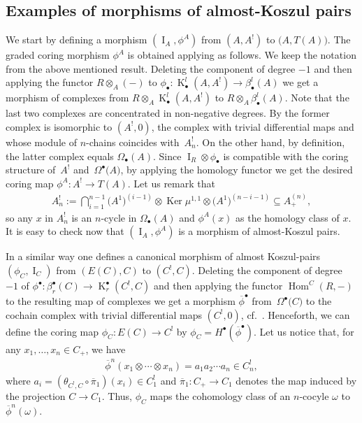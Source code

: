 \documentclass[pdftex]{sigma}
\newcommand{\ol}[1]{\overline{#1}}
\def\Id{\operatorname{I}}
\DeclareMathOperator{\Ker}{Ker}
\DeclareMathOperator{\K}{K}
\newcommand\ot{\otimes}
\newcommand{\Od}[2]{\Omega_{#1}(#2)}
\newcommand{\Ou}[2]{\Omega^{#1}\big(#2\big)}
\renewcommand{\^}[1]{\mbox{$^{\left( #1 \right)}$}}
\renewcommand{\_}[1]{\mbox{$_{\left( #1 \right)}$}}
\newcommand\Hom{\operatorname{Hom}}
\numberwithin{equation}{section}
\begin{document}
\subsection{Examples of morphisms of almost-Koszul pairs}\label{fa:exemples_morphisms}
We start by def\/ining a morphism $(\Id_A,\phi^A)$ from $(A,A^!)$ to $\big(A,T(A)\big)$. The graded coring morphism $\phi^A$ is obtained applying \cite[Proposition 1.24]{jps} as follows. We keep the notation from the above mentioned result. Deleting the component of degree $-1$ and then applying the functor $R\ot_A (-)$ to $\phi _{\bullet}\colon \K_{\bullet}^{l}(A,A^!)\to \beta_{\bullet}^{l}(A)$ we get a morphism of complexes from $R\ot_A \K_{\bullet}^{l}(A,A^!)$ to $R\ot_A \beta_{\bullet}^{l}(A)$. Note that the last two complexes are concentrated in non-negative degrees. By \cite[Proposition 1.23]{jps} the former complex is isomorphic to $(A^!,0)$, the complex with tri\-vial dif\/ferential maps and whose module of $n$-chains coincides with~$A^!_n$. On the other hand, by def\/inition, the latter complex equals $\Od{\bullet}{A}$. Since $\Id_R\ot\phi_\bullet$ is compatible with the coring structure of~$A^!$ and~$\Ou{\bullet}{A}$, by applying the homology functor we get the desired coring map $\phi^A\colon A^!\to T(A)$. Let us remark that
\begin{gather*} A^!_n:=\bigcap_{i=1}^{n-1}\big({A^1}\big)^{(i-1)}\ot\Ker\mu^{1,1}\ot \big({A^1}\big)^{(n-i-1)}\subseteq A_+^{(n)},
\end{gather*}
so any $x$ in $A^!_n$ is an $n$-cycle in $\Od{\bullet}{A}$ and $\phi^A(x)$ as the homology class of $x$. It is easy to check now that $(\Id_A,\phi^A)$ is a morphism of almost-Koszul pairs.

In a similar way one def\/ines a canonical morphism of almost Koszul-pairs $(\phi_C,\Id_C)$ from $(E(C),C)$ to $(C^!,C)$. Deleting the component of degree $-1$ of $\phi ^{\bullet}\colon \beta^\bullet_{r}(C)\to \K^\bullet_{r}(C^!,C)$ and then applying the functor $\Hom^C(R, -)$ to the resulting map of complexes we get a morphism $\ol{\phi}^{\bullet}$ from~$\Ou{\bullet}{C}$ to the cochain complex with trivial dif\/ferential maps $(C^!,0)$, cf.\ \cite[Propositions~1.23 and~1.24]{jps}. Henceforth, we can def\/ine the coring map $\phi_C\colon E(C)\to C^!$ by $\phi_C=H^\bullet(\ol{\phi}^{\bullet})$. Let us notice that, for any $x_1,\dots,x_n\in C_+$, we have
\begin{gather*}
 \ol{\phi}^{n}(x_1\ot\cdots \ot x_n)=a_1a_2\cdots a_n\in C^!_n,
\end{gather*}
where $a_i= (\theta_{C^!,C}\circ\ol{\pi}_1)(x_i)\in C^!_1$ and $\ol{\pi}_1\colon C_+\to C_1$ denotes the map induced by the projection $C\to C_1$. Thus, $\phi_C$ maps the cohomology class of an $n$-cocyle $\omega$ to $ \ol{\phi}^{n}(\omega)$.
\end{document}
